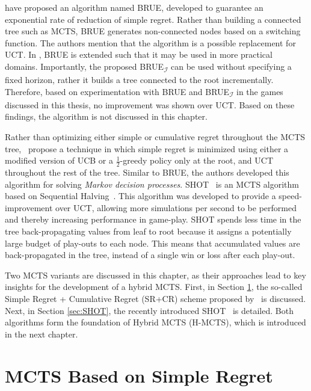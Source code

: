 \documentclass{kecsmstr}
\begin{document}
 have proposed an algorithm named BRUE, developed to guarantee an exponential rate of reduction of simple regret. Rather than building a connected tree such as MCTS, BRUE generates non-connected nodes based on a switching function. The authors mention that the algorithm is a possible replacement for UCT. In , BRUE is extended such that it may be used in more practical domains. Importantly, the proposed BRUE\textsubscript{$\mathcal I$} can be used without specifying a fixed horizon, rather it builds a tree connected to the root incrementally. Therefore, based on experimentation with BRUE and BRUE\textsubscript{$\mathcal I$} in the games discussed in this thesis, no improvement was shown over UCT. Based on these findings, the algorithm is not discussed in this chapter.

Rather than optimizing either simple or cumulative regret throughout the MCTS tree,~ propose a technique in which simple regret is minimized using either a modified version of UCB or a $\frac{1}{2}$-greedy policy only at the root, and UCT throughout the rest of the tree. Similar to BRUE, the authors developed this algorithm for solving \emph{Markov decision processes}. SHOT~ is an MCTS algorithm based on Sequential Halving~. This algorithm was developed to provide a speed-improvement over UCT, allowing more simulations per second to be performed and thereby increasing performance in game-play. SHOT spends less time in the tree back-propagating values from leaf to root because it assigns a potentially large budget of play-outs to each node. This means that accumulated values are back-propagated in the tree, instead of a single win or loss after each play-out.

\vspace{2 mm}
Two MCTS variants are discussed in this chapter, as their approaches lead to key insights for the development of a hybrid MCTS. First, in Section \ref{sec:srmcts}, the so-called Simple Regret + Cumulative Regret (SR+CR) scheme proposed by~ is discussed. Next, in Section \ref{sec:SHOT}, the recently introduced SHOT~ is detailed. Both algorithms form the foundation of Hybrid MCTS (H-MCTS), which is introduced in the next chapter.
\newpage
\section{MCTS Based on Simple Regret}
\label{sec:srmcts}
\end{document}
